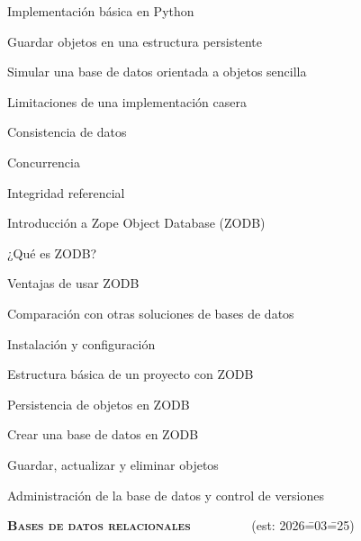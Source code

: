 \begin{longenum}
\begin{longenum}
\begin{longenum}
            \item Implementación básica en Python
            \begin{longenum}
                \item Guardar objetos en una estructura persistente
                \item Simular una base de datos orientada a objetos sencilla
            \end{longenum}
            \item Limitaciones de una implementación casera
            \begin{longenum}
                \item Consistencia de datos
                \item Concurrencia
                \item Integridad referencial
            \end{longenum}
        \end{longenum}
        \item Introducción a Zope Object Database (ZODB)
        \begin{longenum}
            \item ¿Qué es ZODB?
            \begin{longenum}
                \item Ventajas de usar ZODB
                \item Comparación con otras soluciones de bases de datos
            \end{longenum}
            \item Instalación y configuración
            \begin{longenum}
                \item Estructura básica de un proyecto con ZODB
            \end{longenum}
            \item Persistencia de objetos en ZODB
            \begin{longenum}
                \item Crear una base de datos en ZODB
                \item Guardar, actualizar y eliminar objetos
                \item Administración de la base de datos y control de versiones
            \end{longenum}
        \end{longenum}
    \end{longenum}
    \item \textbf{\textsc{Bases de datos relacionales}} \ \ \ \ \ \ \ \ \ (est: 2026\==03\==25)

\end{longenum}
